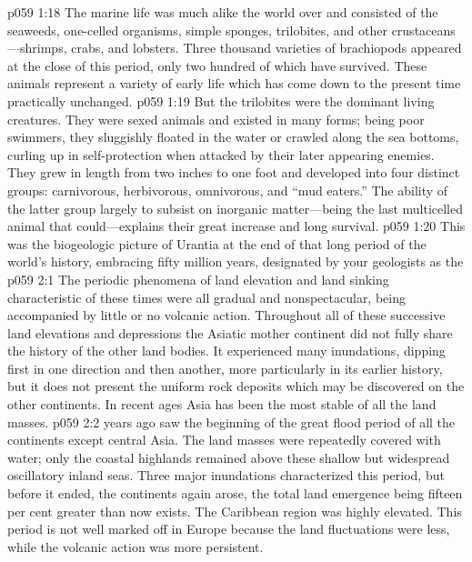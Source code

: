 \pc \vs p059 1:18 The marine life was much alike the world over and consisted of the seaweeds, one\hyp{}celled organisms, simple sponges, trilobites, and other crustaceans---shrimps, crabs, and lobsters. Three thousand varieties of brachiopods appeared at the close of this period, only two hundred of which have survived. These animals represent a variety of early life which has come down to the present time practically unchanged.
\vs p059 1:19 But the trilobites were the dominant living creatures. They were sexed animals and existed in many forms; being poor swimmers, they sluggishly floated in the water or crawled along the sea bottoms, curling up in self\hyp{}protection when attacked by their later appearing enemies. They grew in length from two inches to one foot and developed into four distinct groups: carnivorous, herbivorous, omnivorous, and “mud eaters.” The ability of the latter group largely to subsist on inorganic matter---being the last multicelled animal that could---explains their great increase and long survival.
\vs p059 1:20 This was the biogeologic picture of Urantia at the end of that long period of the world’s history, embracing fifty million years, designated by your geologists as the 
\vs p059 2:1 The periodic phenomena of land elevation and land sinking characteristic of these times were all gradual and nonspectacular, being accompanied by little or no volcanic action. Throughout all of these successive land elevations and depressions the Asiatic mother continent did not fully share the history of the other land bodies. It experienced many inundations, dipping first in one direction and then another, more particularly in its earlier history, but it does not present the uniform rock deposits which may be discovered on the other continents. In recent ages Asia has been the most stable of all the land masses.
\pc \vs p059 2:2  years ago saw the beginning of the great flood period of all the continents except central Asia. The land masses were repeatedly covered with water; only the coastal highlands remained above these shallow but widespread oscillatory inland seas. Three major inundations characterized this period, but before it ended, the continents again arose, the total land emergence being fifteen per cent greater than now exists. The Caribbean region was highly elevated. This period is not well marked off in Europe because the land fluctuations were less, while the volcanic action was more persistent.

